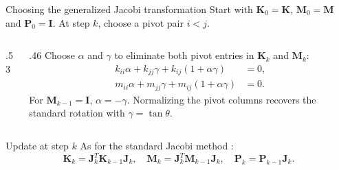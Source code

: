 \documentclass[aspectratio=169]{beamer}
\begin{document}
\begin{frame}{Choosing the generalized Jacobi transformation}
  \small
  Start with $\mathbf K_0=\mathbf K$, $\mathbf M_0=\mathbf M$ and $\mathbf P_0=\mathbf I$. At step $k$, choose a pivot pair $i<j$.
  \vspace{0.2cm}
  \begin{columns}[c,onlytextwidth]
    \begin{column}{.53\textwidth}
      \centering
    \end{column}
    \begin{column}{.46\textwidth}
      Choose $\alpha$ and $\gamma$ to eliminate both pivot entries in $\mathbf K_k$ and $\mathbf M_k$:
      \[
        \begin{aligned}
          k_{ii}\alpha+k_{jj}\gamma+k_{ij}(1+\alpha\gamma) & =0,  \\
          m_{ii}\alpha+m_{jj}\gamma+m_{ij}(1+\alpha\gamma) & =0 .
        \end{aligned}
      \]
      For $\mathbf M_{k-1}=\mathbf I$, $\alpha=-\gamma$.
      Normalizing the pivot columns recovers the standard rotation
      with $\gamma=\tan\theta$.
    \end{column}
  \end{columns}
  \begin{block}{\small Update at step $k$}
    As for the standard Jacobi method :
    \[
      \mathbf K_k=\mathbf J_k^T\mathbf K_{k-1}\mathbf J_k,\quad
      \mathbf M_k=\mathbf J_k^T\mathbf M_{k-1}\mathbf J_k,\quad
      \mathbf P_k=\mathbf P_{k-1}\mathbf J_k .
    \]
  \end{block}
\end{frame}
\end{document}
